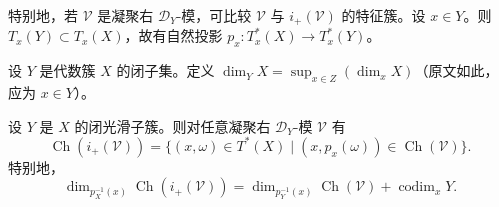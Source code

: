 特别地，若 $\mathcal{V}$ 是凝聚右 $\mathcal{D}_Y$-模，可比较 $\mathcal{V}$ 与 $i_+(\mathcal{V})$ 的特征簇。设 $x\in Y$。则 $T_x(Y)\subset T_x(X)$，故有自然投影 $p_x:T_x^*(X)\to T_x^*(Y)$。

设 $Y$ 是代数簇 $X$ 的闭子集。定义 $\dim_YX=\sup_{x\in Z}(\dim_xX)$（原文如此，应为 $x\in Y$）。

\begin{theorem}\label{thm:4.6.8}
设 $Y$ 是 $X$ 的闭光滑子簇。则对任意凝聚右 $\mathcal{D}_Y$-模 $\mathcal{V}$ 有
$$\operatorname{Ch}(i_+(\mathcal{V}))=\{(x,\omega)\in T^*(X)\mid(x,p_x(\omega))\in\operatorname{Ch}(\mathcal{V})\}.$$
特别地，
$$\dim_{p_X^{-1}(x)}\operatorname{Ch}(i_+(\mathcal{V}))
=\dim_{p_Y^{-1}(x)}\operatorname{Ch}(\mathcal{V})+\operatorname{codim}_xY.$$
\end{theorem}

